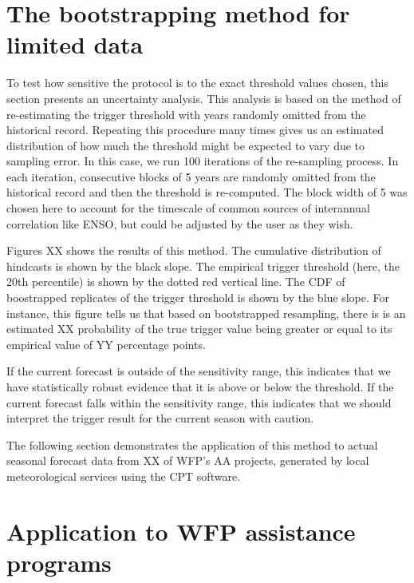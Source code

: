 \documentclass{ametsocV5}
\begin{document}
\section{The bootstrapping method for limited data}


To test how sensitive the protocol is to the exact threshold values chosen, this section presents an uncertainty analysis. This analysis is based on the method of re-estimating the trigger threshold with years randomly omitted from the historical record. Repeating this procedure many times gives us an estimated distribution of how much the threshold might be expected to vary due to sampling error. In this case, we run 100 iterations of the re-sampling process. In each iteration, consecutive blocks of 5 years are randomly omitted from the historical record and then the threshold is re-computed. The block width of 5 was chosen here to account for the timescale of common sources of interannual correlation like ENSO, but could be adjusted by the user as they wish. 

Figures XX shows the results of this method. The cumulative distribution of hindcasts is shown by the black slope. The empirical trigger threshold (here, the 20th percentile) is shown by the dotted red vertical line. The CDF of boostrapped replicates of the trigger threshold is shown by the blue slope. For instance, this figure tells us that based on bootstrapped resampling, there is is an estimated XX probability of the true trigger value being greater or equal to its empirical value of YY percentage points. 

If the current forecast is outside of the sensitivity range, this indicates that we have statistically robust evidence that it is above or below the threshold. If the current forecast falls within the sensitivity range, this indicates that we should interpret the trigger result for the current season with caution.

The following section demonstrates the application of this method to actual seasonal forecast data from XX of WFP's AA projects, generated by local meteorological services using the CPT software. 

\section{Application to WFP assistance programs}
\end{document}
